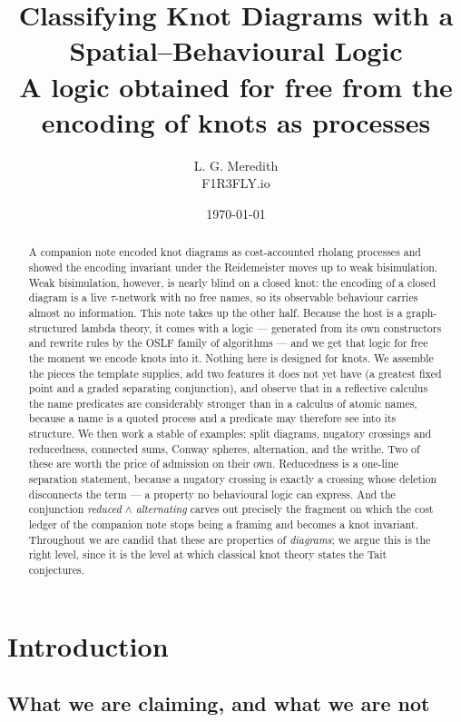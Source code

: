 \documentclass[11pt]{article}
\title{Classifying Knot Diagrams with a Spatial--Behavioural Logic\\
\large A logic obtained for free from the encoding of knots as processes}
\author{L. G. Meredith\\ F1R3FLY.io}
\date{\today}
\theoremstyle{definition}
\begin{document}
\maketitle

\begin{abstract}
A companion note encoded knot diagrams as cost-accounted rholang processes and
showed the encoding invariant under the Reidemeister moves up to weak
bisimulation. Weak bisimulation, however, is nearly blind on a closed knot: the
encoding of a closed diagram is a live $\tau$-network with no free names, so its
observable behaviour carries almost no information. This note takes up the other
half. Because the host is a graph-structured lambda theory, it comes with a
logic --- generated from its own constructors and rewrite rules by the OSLF
family of algorithms --- and we get that logic for free the moment we encode
knots into it. Nothing here is designed for knots. We assemble the pieces the
template supplies, add two features it does not yet have (a greatest fixed point
and a graded separating conjunction), and observe that in a reflective calculus
the name predicates are considerably stronger than in a calculus of atomic names,
because a name is a quoted process and a predicate may therefore see into its
structure. We then work a stable of examples: split diagrams, nugatory crossings
and reducedness, connected sums, Conway spheres, alternation, and the writhe.
Two of these are worth the price of admission on their own. Reducedness is a
one-line separation statement, because a nugatory crossing is exactly a crossing
whose deletion disconnects the term --- a property no behavioural logic can
express. And the conjunction \emph{reduced} $\wedge$ \emph{alternating} carves
out precisely the fragment on which the cost ledger of the companion note stops
being a framing and becomes a knot invariant. Throughout we are candid that these
are properties of \emph{diagrams}; we argue this is the right level, since it is
the level at which classical knot theory states the Tait conjectures.
\end{abstract}

\tableofcontents

\section{Introduction}

\subsection{What we are claiming, and what we are not}
\end{document}
